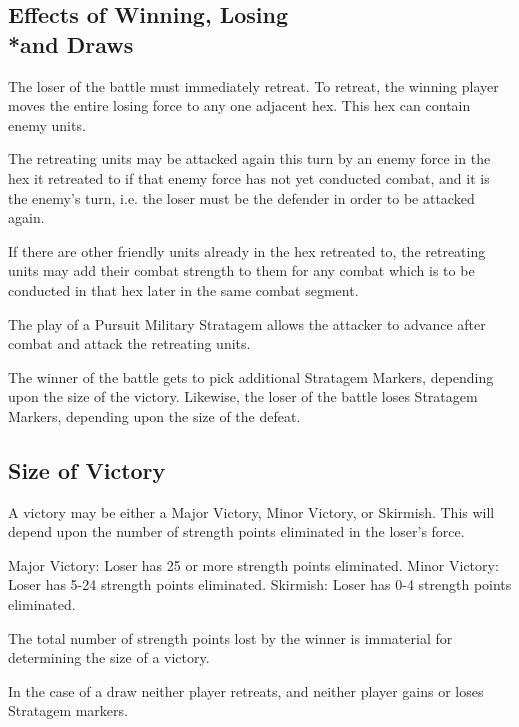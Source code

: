 \subsection{Effects of Winning, Losing\\*and Draws}

The loser of the battle must immediately retreat. To retreat, the winning player moves the entire losing force to any one adjacent hex. This hex can contain enemy units.

The retreating units may be attacked again this turn by an enemy force in the hex it retreated to if that enemy force has not yet conducted combat, and it is the enemy's turn, i.e. the loser must be the defender in order to be attacked again.

If there are other friendly units already in the hex retreated to, the retreating units may add their combat strength to them for any combat which is to be conducted in that hex later in the same combat segment.

The play of a Pursuit Military Stratagem allows the attacker to advance after combat and attack the retreating units.

The winner of the battle gets to pick additional Stratagem Markers, depending upon the size of the victory. Likewise, the loser of the battle loses Stratagem Markers, depending upon the size of the defeat.

\subsection{Size of Victory}

A victory may be either a Major Victory, Minor Victory, or Skirmish. This will depend upon the number of strength points eliminated in the loser's force.

Major Victory: Loser has 25 or more strength points eliminated.
Minor Victory: Loser has 5-24 strength points eliminated.
Skirmish: Loser has 0-4 strength points eliminated.

The total number of strength points lost by the winner is immaterial for determining the size of a victory.

In the case of a draw neither player retreats, and neither player gains or loses Stratagem markers.